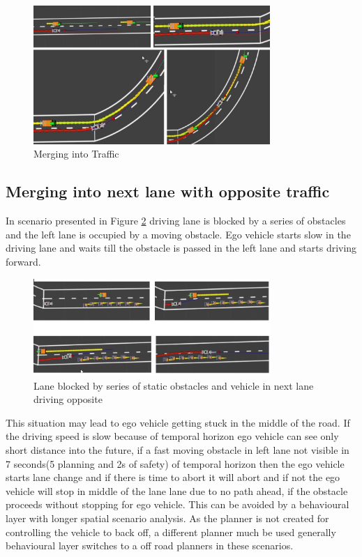 \begin{figure}[H]
    \centering
    \includegraphics[width=0.8\textwidth]{Images/evaluation/merging1.jpg}
    \caption{Merging into Traffic}
    \label{merging1}
\end{figure}

\subsection{Merging into next lane with opposite traffic}

In scenario presented in Figure \ref{series_obstacles} driving lane is blocked by a series of obstacles and the left lane is occupied by a moving obstacle. Ego vehicle starts slow in the driving lane and waits till the obstacle is passed in the left lane and starts driving forward. 
\begin{figure}[H]
    \centering
    \includegraphics[width=0.8\textwidth]{Images/evaluation/series_lane_blocked1.jpg}
    \caption{Lane blocked by series of static obstacles and vehicle in next lane driving opposite}
    \label{series_obstacles}
\end{figure}

This situation may lead to ego vehicle getting stuck in the middle of the road. If the driving speed is slow because of temporal horizon ego vehicle can see only short distance into the future, if a fast moving obstacle in left lane not visible in 7 seconds(5 planning and 2s of safety) of temporal horizon then the ego vehicle starts lane change and if there is time to abort it will abort and if not the ego vehicle will stop in middle of the lane lane due to no path ahead, if the obstacle proceeds without stopping for ego vehicle. This can be avoided by a behavioural layer with longer spatial scenario analysis. As the planner is not created for controlling the vehicle to back off, a different planner much be used generally behavioural layer switches to a off road planners in these scenarios.  


